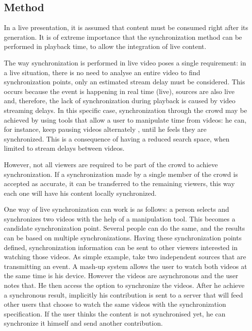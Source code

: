 \documentclass[jidm,a4paper]{jidm} %
\begin{document}
\subsection{Method}
In a live presentation, it is assumed that content must be consumed right after its generation. It is of extreme importance that the synchronization method can be performed in playback time, to allow the integration of live content.

The way synchronization is performed in live video poses a single requirement: in a live situation, there is no need to analyse an entire video to find synchronization points, only an estimated stream delay must be considered. This occurs because the event is happening in real time (live), sources are also live and, therefore, the lack of synchronization during playback is caused by video streaming delays. In this specific case, synchronization through the crowd may be achieved by using tools that allow a user to manipulate time from videos: he can, for instance, keep pausing videos alternately , until he feels they are synchronized. This is a consequence of having a reduced search space, when limited to stream delays between videos.

However, not all viewers are required to be part of the crowd to achieve synchronization. If a synchronization made by a single member of the crowd is accepted as accurate, it can be transferred to the remaining viewers, this way each one will have his content locally synchronized.

One way of live synchronization can work is as follows: a person selects and synchronizes two videos with the help of a manipulation tool. This becomes a candidate synchronization point. Several people can do the same, and the results can be based on multiple synchronizations. Having these synchronization points defined, synchronization information can be sent to other viewers interested in watching those videos. As simple example, take two independent sources that are transmitting an event. A mash-up system allows the user to watch both videos at the same time is his device. However the videos are asynchronous and the user notes that. He then access the option to synchronize the videos. After he achieve a synchronous result, implicitly his contribution is sent to a server that will feed other users that choose to watch the same videos with the synchronization specification. If the user thinks the content is not synchronised yet, he can synchronize it himself and send another contribution.
\end{document}

